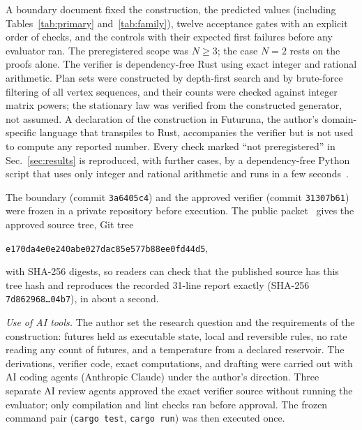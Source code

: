 \documentclass[aps,pre,preprint,superscriptaddress,nofootinbib]{revtex4-2}
\theoremstyle{definition}
\theoremstyle{remark}
\begin{document}
A boundary document fixed the construction, the predicted values (including Tables~\ref{tab:primary} and~\ref{tab:family}), twelve acceptance gates with an explicit order of checks, and the controls with their expected first failures before any evaluator ran. The preregistered scope was $N\ge3$; the case $N=2$ rests on the proofs alone. The verifier is dependency-free Rust using exact integer and rational arithmetic. Plan sets were constructed by depth-first search and by brute-force filtering of all vertex sequences, and their counts were checked against integer matrix powers; the stationary law was verified from the constructed generator, not assumed. A declaration of the construction in Futuruna, the author's domain-specific language that transpiles to Rust, accompanies the verifier but is not used to compute any reported number. Every check marked ``not preregistered'' in Sec.~\ref{sec:results} is reproduced, with further cases, by a dependency-free Python script that uses only integer and rational arithmetic and runs in a few seconds~\cite{CFPACKET}.

The boundary (commit \texttt{3a6405c4}) and the approved verifier (commit \texttt{31307b61}) were frozen in a private repository before execution. The public packet~\cite{CALCEF} gives the approved source tree, Git tree
\begin{center}\texttt{e170da4e0e240abe027dac85e577b88ee0fd44d5},\end{center}
with SHA-256 digests, so readers can check that the published source has this tree hash and reproduces the recorded 31-line report exactly (SHA-256 \texttt{7d862968\ldots04b7}), in about a second.

\emph{Use of AI tools.} The author set the research question and the requirements of the construction: futures held as executable state, local and reversible rules, no rate reading any count of futures, and a temperature from a declared reservoir. The derivations, verifier code, exact computations, and drafting were carried out with AI coding agents (Anthropic Claude) under the author's direction. Three separate AI review agents approved the exact verifier source without running the evaluator; only compilation and lint checks ran before approval. The frozen command pair (\texttt{cargo test}, \texttt{cargo run}) was then executed once.
\end{document}
